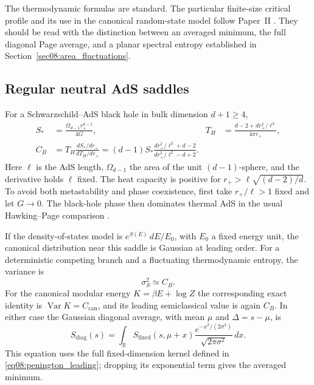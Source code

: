 \documentclass[11pt,letterpaper]{article}
\theoremstyle{plain}
\theoremstyle{definition}
\theoremstyle{remark}
\begin{document}
The thermodynamic formulas are standard. The particular finite-size critical
profile and its use in the canonical random-state model follow
Paper~II \citep{wuebben2026paper2}. They should be read with the distinction
between an averaged minimum, the full diagonal Page average, and a planar
spectral entropy established in Section~\ref{sec08:area_fluctuations}.

\subsection{Regular neutral AdS saddles}
\label{subsec09:universal_broadening}

For a Schwarzschild--AdS black hole in bulk dimension $d+1\geq4$,
\begin{align}
 S_*&=\frac{\Omega_{d-1}r_+^{d-1}}{4G},&
 T_H&=\frac{d-2+d r_+^2/\ell^2}{4\pi r_+},\nonumber\\
 C_B&=T_H\frac{dS_*/dr_+}{dT_H/dr_+}
 =(d-1)S_*\frac{d r_+^2/\ell^2+d-2}
                    {d r_+^2/\ell^2-d+2}.
 \label{eq09:neutral_thermodynamics}
\end{align}
Here $\ell$ is the AdS length, $\Omega_{d-1}$ the area of the unit
$(d-1)$-sphere, and the derivative holds $\ell$ fixed. The heat capacity is
positive for $r_+>\ell\sqrt{(d-2)/d}$. To avoid both metastability and phase
coexistence, first take $r_+/\ell>1$ fixed and let $G\to0$. The black-hole
phase then dominates thermal AdS in the usual Hawking--Page comparison
\citep{hawkingpage1983,witten1998}.

If the density-of-states model is $e^{S(E)}\,dE/E_0$, with $E_0$ a fixed
energy unit, the canonical distribution near this saddle is Gaussian at
leading order. For a deterministic competing branch and a fluctuating
thermodynamic entropy, the variance is
\begin{equation}
 \sigma_S^2\simeq C_B.
 \label{eq09:sigma_squared}
\end{equation}
For the canonical modular energy $K=\beta E+\log Z$ the corresponding exact
identity is $\operatorname{Var}K=C_{\mathrm{can}}$, and its leading
semiclassical value is again $C_B$. In either case the Gaussian diagonal
average, with mean $\mu$ and $\Delta=s-\mu$, is
\begin{equation}
 S_{\mathrm{diag}}(s)
 =\int_{\mathbb R}S_{\mathrm{fixed}}(s,\mu+x)
      \frac{e^{-x^2/(2\sigma^2)}}{\sqrt{2\pi\sigma^2}}\,dx.
 \label{eq09:convolution}
\end{equation}
This equation uses the full fixed-dimension kernel defined in
\eqref{eq08:penington_leading}; dropping its exponential term gives the
averaged minimum.
\end{document}
